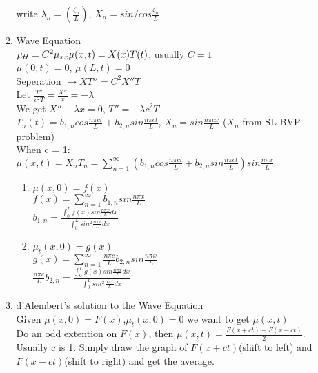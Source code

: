 \documentclass[10pt]{article}
\begin{document}
\begin{multicols}{2}
\begin{enumerate}
\begin{enumerate}
				write $\lambda_n = (\frac{\zeta_n}{L})$, $X_n = sin/cos \frac{\zeta_n}{L}$
			\item Wave Equation\\
				$\mu_{tt} = C^2\mu_{xx}\\
				\mu(x,t) = X(x)T(t)$, usually $C = 1$\\
				$\mu (0,t) = 0$, $\mu (L,t)=0$\\
			 	Seperation $\rightarrow XT'' = C^2X''T$\\
				Let $\frac{T''}{c^2T} = \frac{X''}{x} = -\lambda$\\
				We get $X'' + \lambda x = 0$, $T'' =  -\lambda c^2T$\\
				$T_n(t) = b_{1,n}cos\frac{n\pi ct}{L} + b_{2,n}sin\frac{n\pi ct}{L}$, $X_n = sin\frac{n\pi cx}{L}$ ($X_n$ from SL-BVP problem)\\
				When c = 1:\\
				$\mu (x,t) = X_nT_n = \sum_{n = 1}^{\infty}(b_{1,n}cos\frac{n\pi ct}{L} + b_{2,n}sin\frac{n\pi c t}{L})sin\frac{n\pi x}{L}$
				\begin{enumerate}
					\item $\mu(x,0) = f(x)$\\
					$f(x) = \sum_{n = 1}^{\infty}b_{1,n}sin\frac{n\pi x}{L}$\\
					$b_{1,n} = \frac{\int_{0}^{L}f(x)sin\frac{n\pi x}{L}dx}{\int_{0}^{L}sin^2\frac{n\pi x}{L}dx}$\\
					\item $\mu_t(x,0) = g(x)$\\
					$g(x) = \sum_{n = 1}^{\infty} \frac{n\pi c}{L}b_{2,n}sin\frac{n\pi x}{L}$\\
					$\frac{n\pi c}{L}b_{2,n} = \frac{\int_{0}^{L}g(x)sin\frac{n\pi x}{L}dx}{\int_{0}^{L}sin^2\frac{n\pi x}{L}dx}$
				\end{enumerate}
			\item d'Alembert's solution to the Wave Equation\\
				Given $\mu (x,0) = F(x)$,$\mu_t (x,0) = 0$ we want to get $\mu(x,t)$\\
				Do an odd extention on $F(x)$, then $\mu(x,t) = \frac{F(x+ct) + F(x-ct)}{2}$. Usually c is 1. Simply draw the graph of $F(x+ct)$(shift to left) and $F(x-ct)$(shift to right) and get the average.
	    \end{enumerate}
    

\end{enumerate}
\end{multicols}
\end{document}
